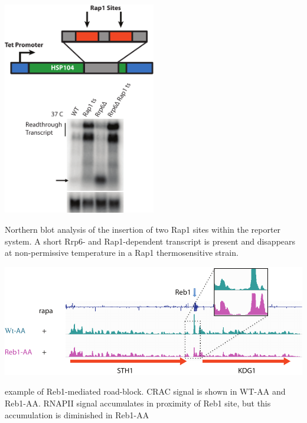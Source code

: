 \begin{suppfigure}[h!]

\centering
\includegraphics[width=0.5\textwidth]{figures/results/rap/S4.pdf}
\caption[Insertion of Rap1 sites into a heterologous context]{Northern blot analysis of the insertion of two Rap1 sites within the reporter system. A short Rrp6- and Rap1-dependent transcript is present and disappears at non-permissive temperature in a Rap1 thermosensitive strain.}
\label{fig:S4}

\end{suppfigure}




\begin{suppfigure}[h!]

\centering
\includegraphics[width=\textwidth]{figures/results/rap/S5.pdf}
\caption[example of Reb1 mediated road-block]{example of Reb1-mediated road-block. CRAC signal is shown in WT-AA and Reb1-AA. RNAPII signal accumulates in proximity of Reb1 site, but this accumulation is diminished in Reb1-AA}
\label{fig:S5}

\end{suppfigure}



